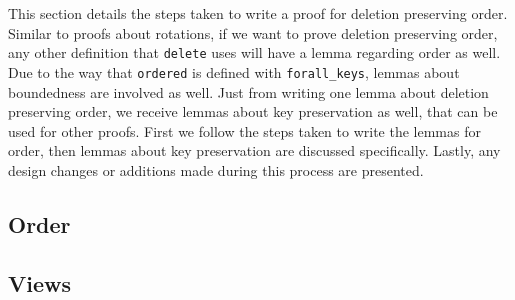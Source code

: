 This section details the steps taken to write a proof for deletion preserving order. Similar to proofs about rotations, if we want to prove deletion preserving order, any other definition that \lstinline{delete} uses will have a lemma regarding order as well. Due to the way that \lstinline{ordered} is defined with \lstinline{forall_keys}, lemmas about boundedness are involved as well. Just from writing one lemma about deletion preserving order, we receive lemmas about key preservation as well, that can be used for other proofs. First we follow the steps taken to write the lemmas for order, then lemmas about key preservation are discussed specifically. Lastly, any design changes or additions made during this process are presented.

\subsection*{Order}


\subsection*{Views}
